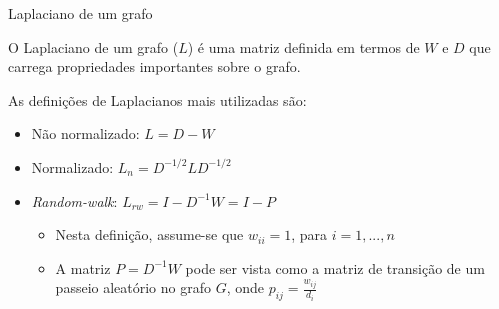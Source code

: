 \documentclass[11pt]{beamer}
\begin{document}
\begin{frame}{Laplaciano de um grafo}

O Laplaciano de um grafo ($L$) é uma matriz definida em termos de $W$ e $D$ que carrega propriedades importantes sobre o grafo. 

\vspace{0.3cm}

As definições de Laplacianos mais utilizadas são:

\begin{itemize}
\item Não normalizado: $L = D - W$
\vspace{0.3cm}
\item Normalizado: $L_{n} = D^{-1/2}LD^{-1/2}$
\vspace{0.3cm}
\item \textit{Random-walk}: $L_{rw} = I - D^{-1}W = I - P$

\begin{itemize}
\item Nesta definição, assume-se que $w_{ii} = 1$, para $i = 1, ..., n$ 
\vspace{0.4cm}
\item A matriz $P = D^{-1}W$ pode ser vista como a matriz de transição de um passeio aleatório no grafo $G$, onde $p_{ij} = \frac{w_{ij}}{d_i}$ 

\end{itemize}

\end{itemize}

\end{frame}
\end{document}
